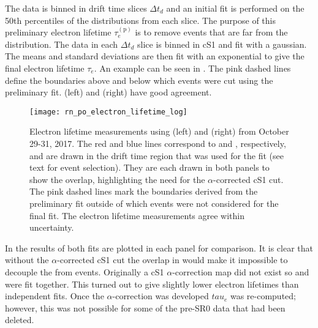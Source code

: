 The data is binned in drift time slices $\Delta t_d$ and an initial fit is performed on the 50th percentiles of the \stwob distributions
from each slice.  The purpose of this preliminary electron lifetime $\tau_e^{(\mathrm{p})}$ is to remove events that are far from the
distribution.  The data
in each $\Delta t_d$ slice is binned in cS1 and fit with a gaussian.  The means and standard deviations are then fit
with an exponential to give the final electron lifetime $\tau_e$.  An example can be seen in
.  The pink dashed lines define the boundaries above and below which
events were cut using the preliminary fit.   (left) and  (right) have good agreement.

\begin{figure}
\centering
\texttt{[image: rn\_po\_electron\_lifetime\_log]}
\caption{Electron lifetime measurements using  (left) and  (right) from October 29-31, 2017.  The red and blue
lines correspond to  and , respectively, and are drawn in the drift time region that was used for the fit (see
text for event selection).  They are each drawn in both panels to show the \stwob overlap, highlighting the need for the
$\alpha$-corrected cS1 cut.  The pink dashed lines mark the boundaries derived from the preliminary fit outside of which events were not
considered for the final fit.  The electron lifetime measurements agree within uncertainty.}
\label{fig:electron_lifetimes_measurement_alphas_elifetime}
\end{figure}

In  the results of both fits are plotted in each panel for comparison.  It is
clear that without the $\alpha$-corrected cS1 cut the overlap in \stwob would make it impossible to decouple the  from
 events.  Originally a cS1 $\alpha$-correction map did not exist so  and  were fit together.  This
turned out to give slightly lower electron lifetimes than independent fits.  Once
the $\alpha$-correction was developed $tau_e$ was re-computed; however, this was not possible for some of the pre-SR0 data that had been
deleted.

